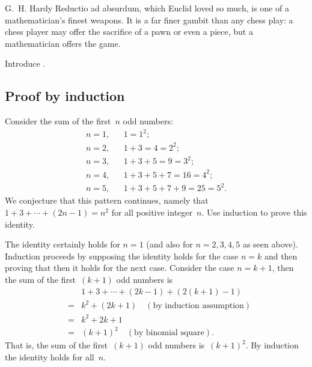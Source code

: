 \begin{draft}
\begin{quoted}{G.~H. Hardy}
Reductio ad absurdum, which Euclid loved so much, is one of a mathematician's finest weapons.  
It is a far finer gambit than any chess play: a chess player may offer the sacrifice of a pawn or even a piece, but a mathematician offers the game.
\end{quoted}

Introduce .




\subsection{Proof by induction}
\label{sec:pi}


\begin{example} \label{eg:}
Consider the sum of the first~\(n\) odd numbers:
\begin{eqnarray*}
n=1,&&1=1^2;\\
n=2,&&1+3=4=2^2;\\
n=3,&&1+3+5=9=3^2;\\
n=4,&&1+3+5+7=16=4^2;\\
n=5,&&1+3+5+7+9=25=5^2.
\end{eqnarray*}
We conjecture that this pattern continues, namely that \(1+3+\cdots+(2n-1)=n^2\) for all positive integer~\(n\).
Use induction to prove this identity.
\begin{solution} 
The identity certainly holds for \(n=1\) (and also for \(n=2,3,4,5\) as seen above).
Induction proceeds by supposing the identity holds for the case \(n=k\) and then proving that then it holds for the next case.
Consider the case \(n=k+1\), then the sum of the first~\((k+1)\) odd numbers is
\begin{eqnarray*}
&&1+3+\cdots+(2k-1)+(2(k+1)-1)\\
&=&k^2+(2k+1)\quad(\text{by induction assumption})\\
&=&k^2+2k+1\\
&=&(k+1)^2\quad(\text{by binomial square}).
\end{eqnarray*}
That is, the sum of the first~\((k+1)\) odd numbers is~\((k+1)^2\).
By induction the identity holds for all~\(n\).
\end{solution}
\end{example}





\sectionExercises




\end{draft}
